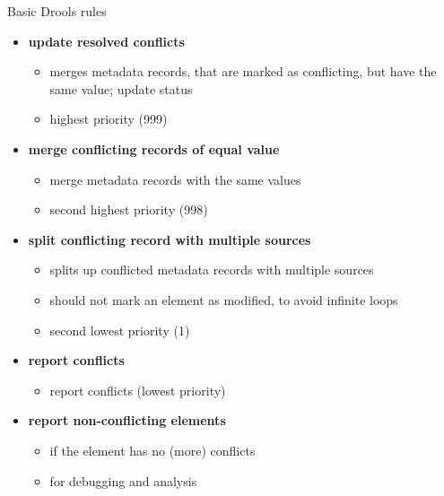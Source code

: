 \documentclass{beamer}
\begin{document}
\begin{frame}{Basic Drools rules}

   \begin{itemize}
   \item \textbf{update resolved conflicts}
   \begin{itemize}
	   \item merges metadata records, that are marked as conflicting, but have the same value; update status
	   \item highest priority (999)
   \end{itemize}
   \item \textbf{merge conflicting records of equal value}
   \begin{itemize}
   		\item merge metadata records with the same values
   		\item second highest priority (998)
   \end{itemize}
   \item \textbf{split conflicting record with multiple sources} 
   \begin{itemize}
   		\item splits up conflicted metadata records with multiple sources
   		\item should not mark an element as modified, to avoid infinite loops
   		\item second lowest priority (1)
   \end{itemize}
   \item \textbf{report conflicts} 
      \begin{itemize}
      		\item report conflicts (lowest priority)
      \end{itemize}
   \item \textbf{report non-conflicting elements} 
      \begin{itemize}
      		\item if the element has no (more) conflicts
      		\item for debugging and analysis
      \end{itemize}
   \end{itemize}
  
\note{

}
\end{frame}
\end{document}

